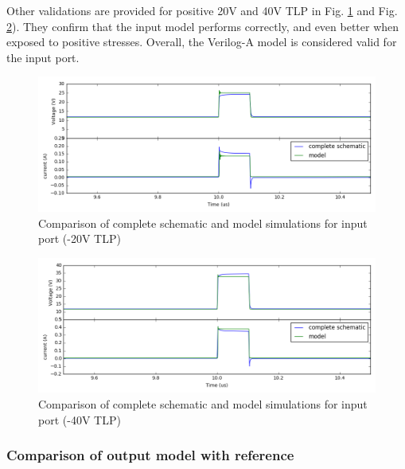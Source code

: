 Other validations are provided for positive 20V and 40V TLP in Fig. \ref{fig:compare-model-simu-20} and Fig. \ref{fig:compare-model-simu-40}).
They confirm that the input model performs correctly, and even better when exposed to positive stresses.
Overall, the Verilog-A model is considered valid for the input port.

\begin{figure}[!h]
  \centering
  \includegraphics[width=\textwidth]{src/4/figures/comparison_model_total_20V.png}
  \caption{Comparison of complete schematic and model simulations for input port (-20V TLP)}
  \label{fig:compare-model-simu-20}
\end{figure}

\begin{figure}[!h]
  \centering
  \includegraphics[width=\textwidth]{src/4/figures/comparison_model_total_40V.png}
  \caption{Comparison of complete schematic and model simulations for input port (-40V TLP)}
  \label{fig:compare-model-simu-40}
\end{figure}

\subsubsection{Comparison of output model with reference}

